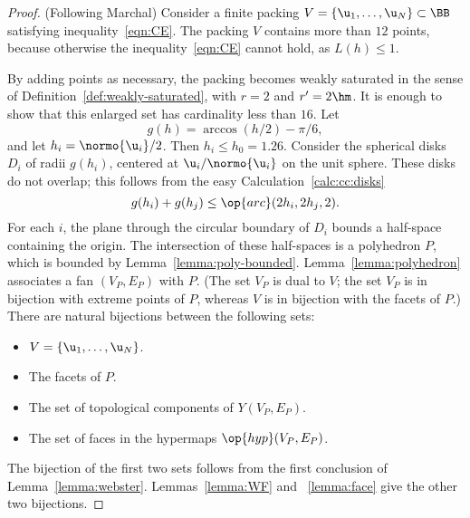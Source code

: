 \begin{proof} (Following Marchal)
Consider a finite packing $ V=\{\u_1,\ldots, \u_N\}\subset \BB$ satisfying
inequality~\ref{eqn:CE}.  The packing $V$ contains more than $12$ points, because otherwise
the inequality~\ref{eqn:CE} cannot hold, as $L(h)\le 1$.

By adding points
as necessary, the packing becomes weakly saturated in the sense of
Definition~\ref{def:weakly-saturated}, with $r=2$ and $r'=2\hm$.  It is enough to show
that this enlarged set has cardinality less than $16$.    Let
\begin{displaymath}%
g(h) = \arccos(h/2) - \pi/6,  %
\end{displaymath}%
and let $h_i =
\normo{ \u_i}/2$.  Then $h_i\le h_0=1.26$.
Consider the spherical disks $D_i$ of radii $g(h_i)$,
centered at $ \u_i/\normo{ \u_i}$ on the unit sphere.  These disks do not overlap; this
follows from the easy
Calculation~\ref{calc:cc:disks} %
\begin{equation}\label{eqn:disks} 
g(h_i) + g(h_j) \le \op{arc}(2h_i,2h_j,2).%
\end{equation}%
%
For each $i$, the plane through the circular boundary of $D_i$ bounds
a half-space containing the origin.  The intersection of these
half-spaces is a polyhedron $P$, which is bounded by
Lemma~\ref{lemma:poly-bounded}.  Lemma~\ref{lemma:polyhedron}
associates a fan $(V_P,E_P)$ with $P$.  (The set $V_P$ is dual to $
V$; the set $V_P$ is in bijection with extreme points of $P$, whereas $
V$ is in bijection with the facets of $P$.)  There are natural
bijections between the following sets:
\begin{itemize} 
\item $ V = \{ \u_1,\ldots, \u_N\}$.
\item The  facets of $P$.
\item The set of  topological components of $Y(V_P,E_P)$.
\item The set of faces in the hypermaps $\op{hyp}(V_P,E_P)$.
\end{itemize}
The bijection of the first two sets follows from the first conclusion
of Lemma~\ref{lemma:webster}.  Lemmas~\ref{lemma:WF} and
~\ref{lemma:face} give the other two bijections.


\end{proof}
